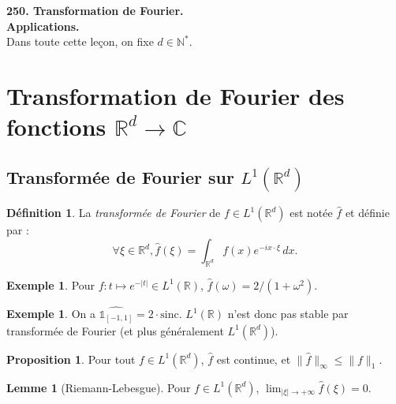 \documentclass[11pt,a4paper,twocolumn]{article}
\author{\textsc{Nguyễn} Lê Thành Dũng}
\theoremstyle{definition}
\newtheorem{definition}[equation]{Définition}
\newtheorem{example}[equation]{Exemple}
\newtheorem{proposition}[equation]{Proposition}
\newtheorem{lemma}[equation]{Lemme}
\newcounter{n}
\newcommand\lesson[1]{{\noindent \LARGE \bfseries #1}\\[1pt]}
\def\N{\mathbb{N}}
\def\R{\mathbb{R}}
\def\C{\mathbb{C}}
\def\hf{\hat{f}}
\begin{document}
\lesson{250. Transformation de Fourier.\\ Applications.}

Dans toute cette leçon, on fixe $d \in \N^*$.

\section{Transformation de Fourier des fonctions $\R^d \to \C$}

\subsection{Transformée de Fourier sur $L^1(\R^d)$}

\begin{definition}
La \emph{transformée de Fourier} de $f \in L^1(\R^d)$ est notée $\hf$ et définie par :
\[ \forall \xi \in \R^d, \hf(\xi) = \int_{\R^d} f(x) e^{-ix \cdot \xi} \,dx. \]
\end{definition}

\begin{example}
  Pour $f : t \mapsto e^{-|t|} \in L^1(\R)$, $\hf(\omega) = 2/(1+\omega^2)$.
\end{example}

\begin{example}
  On a $\widehat{\mathbb{1}_{[-1,1]}} = 2 \cdot \mathrm{sinc}$. $L^1(\R)$ n'est donc pas
  stable par transformée de Fourier (et plus généralement $L^1(\R^d)$).
\end{example}

\begin{proposition}
  Pour tout $f \in L^1(\R^d)$, $\hf$ est continue, et $\|\hf\|_\infty \leq
  \|f\|_1$.
\end{proposition}

\begin{lemma}[Riemann-Lebesgue]
  Pour $f \in L^1(\R^d)$,
  $\displaystyle \lim_{|\xi| \to +\infty} \hf(\xi) = 0$.
\end{lemma}


\end{document}
